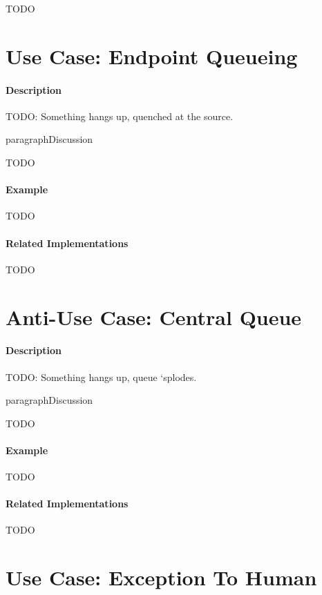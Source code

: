 {\Large TODO}

\section{Use Case: Endpoint Queueing}

\paragraph{Description}

{\Large TODO:} Something hangs up, quenched at the source.

paragraph{Discussion}

{\Large TODO}

\paragraph{Example}

{\Large TODO}

\paragraph{Related Implementations}

{\Large TODO}

\section{Anti-Use Case: Central Queue}

\paragraph{Description}

{\Large TODO:} Something hangs up, queue `splodes.

paragraph{Discussion}

{\Large TODO}

\paragraph{Example}

{\Large TODO}

\paragraph{Related Implementations}

{\Large TODO}

\section{Use Case: Exception To Human}

